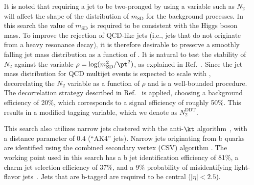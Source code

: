 

It is noted that requiring a jet to be two-pronged by using a variable
such as $N_2$ will affect the shape of the distribution of $m_\text{SD}$ for the
background processes. In this search the value of $m_\text{SD}$ is required to be consistent with the Higgs boson mass.
To improve the rejection of QCD-like jets (i.e., jets that
do not originate from a heavy resonance decay), it is therefore desirable to preserve a smoothly falling jet mass
distribution  as a function of \pt. It is natural to test
the stability of $N_2$ against the variable
$\rho=\log(m_{\text{SD}}^2/\pt^2)$, as explained in
Ref.~\cite{ddt}. Since the jet mass distribution for QCD multijet
events is expected to scale with \pt, decorrelating the $N_2$ variable
as a function of $\rho$ and \pt is a well-bounded procedure. The
decorrelation strategy described in Ref.~\cite{ddt} is applied,
choosing a background efficiency of 20\%, which corresponds to a
signal efficiency of roughly 50\%. This results in a modified tagging
variable, which we denote as $N_2^\text{DDT}$.

This search also utilizes narrow jets clustered
with the anti-$\kt$ algorithm~\cite{Cacciari:2008gp}, with a distance
parameter of $0.4$ (“AK4” jets). Narrow jets originating from b quarks are identified using the combined secondary vertex (CSV) algorithm \cite{Sirunyan:2017ezt, BTV-paper-2012-001}. The working point used in this search has a b jet identification efficiency of 81\%, a charm jet selection efficiency of 37\%, and a 9\% probability of misidentifying light-flavor jets~\cite{Sirunyan:2017ezt}. Jets that are b-tagged are required to be central ($|\eta|<2.5$).

